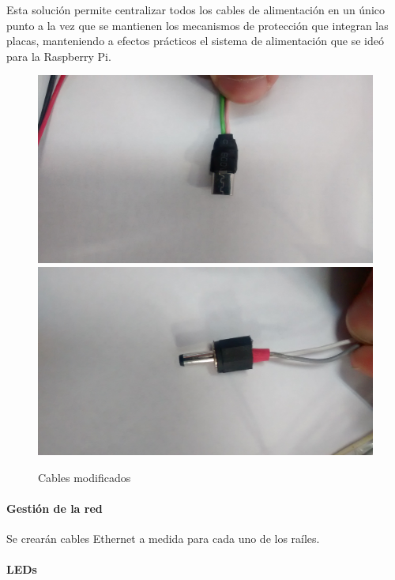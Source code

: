 Esta solución permite centralizar todos los cables de alimentación en un único punto a la vez que se mantienen los mecanismos de protección que integran las placas, manteniendo a efectos prácticos el sistema de alimentación que se ideó para la Raspberry Pi.

\begin{figure}[H]
	\centering
	\includegraphics[height=0.12\textheight]{Chapters/Chapter5/Figures/usb}
	\includegraphics[height=0.12\textheight]{Chapters/Chapter5/Figures/dcplug}
	\caption{Cables modificados}
\end{figure}

\paragraph{Gestión de la red\\}

Se crearán cables Ethernet a medida para cada uno de los raíles.

\paragraph{LEDs\\}

